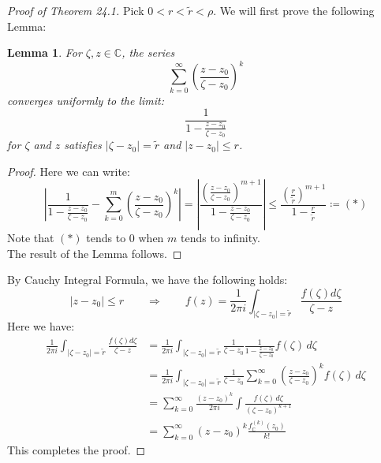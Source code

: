 \documentclass[15pt]{book}
\theoremstyle{break}
\theoremstyle{break}
\newtheorem{lem}{Lemma}[thm]
\newcommand{\Complex}{\mathbb{C}}
\newcommand{\that}[1]{\widetilde{#1}}
\begin{document}
\begin{proof}[Proof of Theorem 24.1]
Pick $0<r<\that{r} <\rho$. We will first prove the following Lemma:
\begin{lem}
\setlength{\leftskip}{1cm}
For $\zeta,z \in \Complex$, the series $$\sum_{k=0}^\infty \left( \frac{z-z_0}{\zeta - z_0}\right)^k$$
converges uniformly to the limit:
$$\frac{1}{1-\frac{z-z_0}{\zeta - z_0}}$$ 
for $\zeta$ and $z$ satisfies $|\zeta - z_0| = \that{r}$ and $|z-z_0| \leq r$.
\end{lem}

\begin{proof}
\setlength{\leftskip}{1cm} Here we can write:
$$\left|\frac{1}{1-\frac{z-z_0}{\zeta - z_0}} - \sum_{k=0}^m \left( \frac{z-z_0}{\zeta - z_0}\right)^k \right|=\left| \frac{\left(\frac{z-z_0}{\zeta - z_0}\right)^{m+1}}{1- \frac{z-z_0}{\zeta - z_0}}\right| \leq \frac{\left( \frac{r}{\that{r}}\right)^{m+1}}{1-\frac{r}{\that{r}}} \coloneqq (*)$$
Note that $(*)$ tends to $0$ when $m$ tends to infinity. \\
The result of the Lemma follows.
\end{proof}

By Cauchy Integral Formula, we have the following holds:
$$|z-z_0|\leq r \qquad\Rightarrow \qquad f(z) = \frac{1}{2\pi i} \int_{|\zeta - z_0|= \that{r}} \frac{f(\zeta)d\zeta}{\zeta - z}$$
Here we have:
\begin{align*}
\frac{1}{2\pi i} \int_{|\zeta - z_0|= \that{r}} \frac{f(\zeta)d\zeta}{\zeta - z} &= \frac{1}{2\pi i}\int_{|\zeta - z_0|= \that{r}} \frac{1}{\zeta - z_0} \frac{1}{1-\frac{z-z_0}{\zeta - z_0}} f(\zeta) \, d\zeta \\
&= \frac{1}{2\pi i} \int_{|\zeta - z_0| =\that{r}}\frac{1}{\zeta -z_0} \sum_{k=0}^\infty\left(\frac{z-z_0}{\zeta - z_0}\right)^k f(\zeta)\,d\zeta\\
&=\sum_{k=0}^\infty \frac{(z-z_0)^k}{2\pi i} \int \frac{f(\zeta)\, d\zeta}{(\zeta - z_0)^{k+1}} \\
&= \sum_{k=0}^\infty (z-z_0)^k \frac{f^{(k)}_{\Complex} (z_0)}{k!}
\end{align*}
This completes the proof.
\end{proof}
\end{document}
